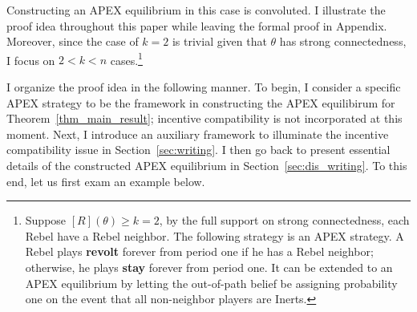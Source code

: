 \documentclass[12pt,letter]{article}
\theoremstyle{definition}
\theoremstyle{remark}
\theoremstyle{claim}
\begin{document}
Constructing an APEX equilibrium in this case is convoluted. I illustrate the proof idea throughout this paper while leaving the formal proof in Appendix. Moreover, since the case of $k=2$ is trivial given that $\theta$ has strong connectedness, I focus on $2<k<n$ cases.\footnote{Suppose $[R](\theta)\geq k=2$, by the full support on strong connectedness, each Rebel have a Rebel neighbor. The following strategy is an APEX strategy. A Rebel plays \textbf{revolt} forever from period one if he has a Rebel neighbor; otherwise, he plays \textbf{stay} forever from period one. It can be extended to an APEX equilibrium by letting the out-of-path belief be assigning probability one on the event that all non-neighbor players are Inerts.} 

I organize the proof idea in the following manner. To begin, I consider a specific APEX strategy to be the framework in constructing the APEX equilibirum for Theorem~\ref{thm_main_result}; incentive compatibility is not incorporated at this moment. Next, I introduce an auxiliary framework to illuminate the incentive compatibility issue in Section~\ref{sec:writing}. I then go back to present essential details of the constructed APEX equilibrium in Section~\ref{sec:dis_writing}. To this end, let us first exam an example below.

\end{document}
